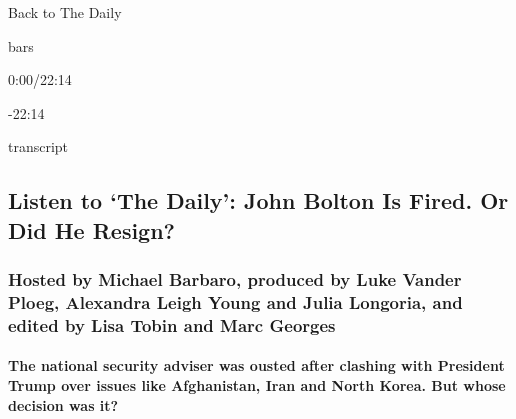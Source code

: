 Back to The Daily

bars

0:00/22:14

-22:14

transcript

\hypertarget{listen-to-the-daily-john-bolton-is-fired-or-did-he-resign-1}{%
\subsection{Listen to `The Daily': John Bolton Is Fired. Or Did He
Resign?}\label{listen-to-the-daily-john-bolton-is-fired-or-did-he-resign-1}}

\hypertarget{hosted-by-michael-barbaro-produced-by-luke-vander-ploeg-alexandra-leigh-young-and-julia-longoria-and-edited-by-lisa-tobin-and-marc-georges}{%
\subsubsection{Hosted by Michael Barbaro, produced by Luke Vander Ploeg,
Alexandra Leigh Young and Julia Longoria, and edited by Lisa Tobin and
Marc
Georges}\label{hosted-by-michael-barbaro-produced-by-luke-vander-ploeg-alexandra-leigh-young-and-julia-longoria-and-edited-by-lisa-tobin-and-marc-georges}}

\hypertarget{the-national-security-adviser-was-ousted-after-clashing-with-president-trump-over-issues-like-afghanistan-iran-and-north-korea-but-whose-decision-was-it}{%
\paragraph{The national security adviser was ousted after clashing with
President Trump over issues like Afghanistan, Iran and North Korea. But
whose decision was
it?}\label{the-national-security-adviser-was-ousted-after-clashing-with-president-trump-over-issues-like-afghanistan-iran-and-north-korea-but-whose-decision-was-it}}

